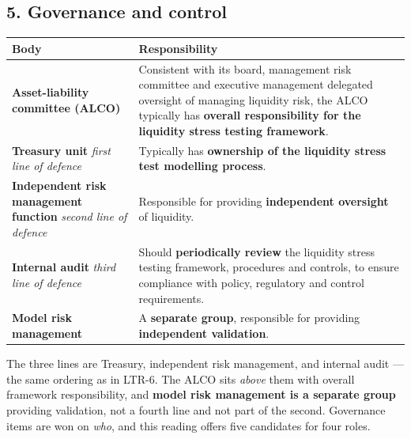 \subsection{5. Governance and control}

\begin{center}
\small
\begin{tabularx}{\textwidth}{@{}p{4.2cm} X@{}}
\toprule
\rowcolor{FRMSoft}\textbf{Body} & \textbf{Responsibility} \\
\midrule
\textbf{Asset-liability committee (ALCO)} & Consistent with its board, management risk committee and executive management delegated oversight of managing liquidity risk, the ALCO typically has \textbf{overall responsibility for the liquidity stress testing framework}. \\
\addlinespace
\textbf{Treasury unit} \newline \emph{first line of defence} & Typically has \textbf{ownership of the liquidity stress test modelling process}. \\
\addlinespace
\textbf{Independent risk management function} \newline \emph{second line of defence} & Responsible for providing \textbf{independent oversight} of liquidity. \\
\addlinespace
\textbf{Internal audit} \newline \emph{third line of defence} & Should \textbf{periodically review} the liquidity stress testing framework, procedures and controls, to ensure compliance with policy, regulatory and control requirements. \\
\addlinespace
\textbf{Model risk management} & A \textbf{separate group}, responsible for providing \textbf{independent validation}. \\
\bottomrule
\end{tabularx}
\end{center}

\begin{lrtrapbox}
The three lines are Treasury, independent risk management, and internal audit --- the same ordering as in LTR-6. The ALCO sits \emph{above} them with overall framework responsibility, and \textbf{model risk management is a separate group} providing validation, not a fourth line and not part of the second. Governance items are won on \emph{who}, and this reading offers five candidates for four roles.
\end{lrtrapbox}

